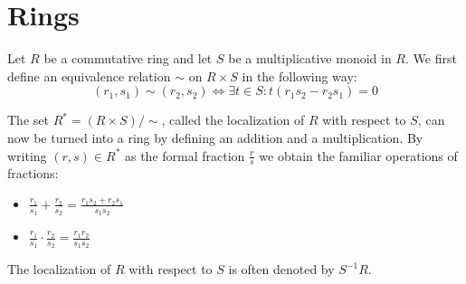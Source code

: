 \section{Rings}
	
	
	
	\begin{construct}[Localization]
		Let $R$ be a commutative ring and let $S$ be a multiplicative monoid in $R$. We first define an equivalence relation $\sim$ on $R\times S$ in the following way:
		\begin{equation}
			(r_1, s_1)\sim(r_2, s_2) \iff \exists t\in S: t(r_1s_2 - r_2s_1) = 0
		\end{equation}
		
		The set $R^* = (R\times S)/\sim$, called the localization of $R$ with respect to $S$, can now be turned into a ring by defining an addition and a multiplication. By writing $(r, s)\in R^*$ as the formal fraction $\frac{r}{s}$ we obtain the familiar operations of fractions:
		\begin{itemize}
			\item $\displaystyle\frac{r_1}{s_1} + \frac{r_2}{s_2} = \frac{r_1s_2 + r_2s_1}{s_1s_2}$
			\item $\displaystyle\frac{r_1}{s_1}\cdot\frac{r_2}{s_2} = \frac{r_1r_2}{s_1s_2}$
		\end{itemize}
	\end{construct}
	
	\begin{notation}
		The localization of $R$ with respect to $S$ is often denoted by $S^{-1}R$.
	\end{notation}

